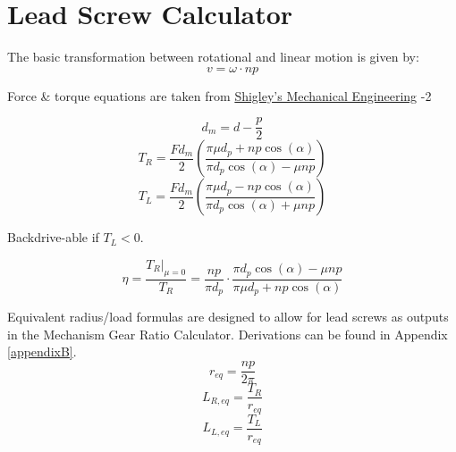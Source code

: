 \documentclass[11pt,a4paper,titlepage]{article}
\begin{document}
	\newpage
	\section{Lead Screw Calculator}
	
	The basic transformation between rotational and linear motion is given by:
	\begin{equation} \label{lead_screw_lin_rot}
	v = \omega \cdot n p
	\end{equation}
	
	Force \& torque equations are taken from \href{https://fac.ksu.edu.sa/sites/default/files/mechanical-disgin-shigley.pdf}{Shigley's Mechanical Engineering} -2
	
	\begin{equation}
	d_m = d - \frac{p}{2}
	\end{equation}
	\begin{equation}
	T_R = \frac{F d_m}{2} \left( \frac{\pi \mu d_p + n p \cos(\alpha)}{\pi d_p \cos(\alpha) - \mu n p} \right)
	\end{equation}
	\begin{equation}
	T_L = \frac{F d_m}{2} \left( \frac{\pi \mu d_p - n p \cos(\alpha)}{\pi d_p \cos(\alpha) + \mu n p} \right)
	\end{equation}
	\begin{center}
		Backdrive-able if $T_L < 0$.
	\end{center}
	\begin{equation}
	\eta = \frac{T_R |_{\mu=0}}{T_R} = \frac{n p}{\pi d_p} \cdot \frac{\pi d_p \cos(\alpha) - \mu n p}{\pi \mu d_p + n p \cos(\alpha)}
	\end{equation}
	
	Equivalent radius/load formulas are designed to allow for lead screws as outputs in the Mechanism Gear Ratio Calculator. Derivations can be found in Appendix \ref{appendixB}.
	\begin{equation} \label{r_eq}
	r_{eq} = \frac{n p}{2 \pi}
	\end{equation}
	\begin{equation}
	L_{R,eq} = \frac{T_R}{r_{eq}}
	\end{equation}
	\begin{equation}
	L_{L,eq} = \frac{T_L}{r_{eq}}
	\end{equation}
	\bigskip
	
\end{document}
